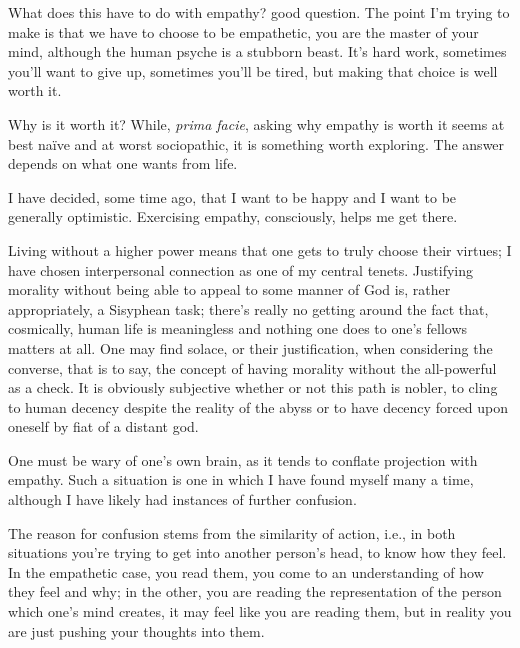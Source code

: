 \documentclass[../butidigress.tex]{subfiles}
\begin{document}
What does this have to do with empathy? good question.
The point I'm trying to make is that we have to choose to be empathetic, you are the master of your mind, although the human psyche is a stubborn beast.
It's hard work, sometimes you'll want to give up, sometimes you'll be tired, but making that choice is well worth it.

Why is it worth it?
While, \textit{prima facie}, asking why empathy is worth it seems at best na\"ive and at worst sociopathic, it is something worth exploring.
The answer depends on what one wants from life.

I have decided, some time ago, that I want to be happy and I want to be generally optimistic.
Exercising empathy, consciously, helps me get there.

Living without a higher power means that one gets to truly choose their virtues; I have chosen interpersonal connection as one of my central tenets.
Justifying morality without being able to appeal to some manner of God is, rather appropriately, a Sisyphean task; there's really no getting around the fact that, cosmically, human life is meaningless and nothing one does to one's fellows matters at all.
One may find solace, or their justification, when considering the converse, that is to say, the concept of having morality without the all-powerful as a check.
It is obviously subjective whether or not this path is nobler, to cling to human decency despite the reality of the abyss or to have decency forced upon oneself by fiat of a distant god.

One must be wary of one's own brain, as it tends to conflate projection with empathy.
Such a situation is one in which I have found myself many a time, although I have likely had instances of further confusion.

The reason for confusion stems from the similarity of action, i.e., in both situations you're trying to get into another person's head, to know how they feel.
In the empathetic case, you read them, you come to an understanding of how they feel and why; in the other, you are reading the representation of the person which one's mind creates, it may feel like you are reading them, but in reality you are just pushing your thoughts into them.
\end{document}
